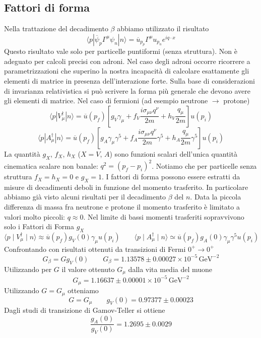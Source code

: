 \subsection{Fattori di forma}
Nella trattazione del decadimento $\beta$ abbiamo utilizzato il risultato 
$$
\langle p | \overline{\psi}_p \Gamma^\mu \psi_n | n \rangle = \overline{u}_{p_p} \Gamma^\mu u_{p_n} e^{iq \cdot x}
$$
Questo risultato vale solo per particelle puntiformi (senza struttura). Non è adeguato per calcoli precisi con adroni. Nel caso degli adroni occorre ricorrere a parametrizzazioni che superino la nostra incapacità di calcolare esattamente gli elementi di matrice in presenza dell'interazione forte. Sulla base di considerazioni di invarianza relativistica si può scrivere la forma più generale che devono avere gli elementi di matrice. Nel caso di fermioni (ad esempio neutrone $\to$ protone)
$$
\langle p | V_\mu^\dagger | n \rangle = \overline{u}(p_f) \left[ g_V \gamma_\mu + f_V \frac{i \sigma_{\mu\nu} q^\nu}{2m} + h_V \frac{q_\mu}{2m} \right] u(p_i)
$$
$$
\langle p | A_\mu^\dagger | n \rangle = \overline{u}(p_f) \left[ g_A \gamma_\mu \gamma^5 + f_A \frac{i \sigma_{\mu\nu} q^\nu}{2m} \gamma^5 + h_A \frac{q_\mu}{2m} \gamma^5 \right] u(p_i)
$$
La quantità $g_X$, $f_X$, $h_X$ ($X=V$, $A$) sono funzioni scalari dell'unica quantità cinematica scalare non banale: $q^2=(p_f-p_i)^2$. Notiamo che per particelle senza struttura $f_X=h_X=0$ e $g_X=1$.
I fattori di forma possono essere estratti da misure di decadimenti deboli in funzione del momento trasferito. In particolare abbiamo già visto alcuni risultati per il decadimento $\beta$ del $n$. Data la piccola differenza di massa fra neutrone e protone il momento trasferito è limitato a valori molto piccoli: $q\approx0$. Nel limite di bassi momenti trasferiti sopravvivono solo i Fattori di Forma $g_X$
$$
\langle p \mid V_\mu^\dagger \mid n \rangle \approx \overline{u}(p_f)g_V(0)\gamma_\mu u(p_i) \quad \quad \langle p \mid A_\mu^\dagger \mid n \rangle \simeq \overline{u}(p_f)g_A(0)\gamma_\mu \gamma^5 u(p_i)
$$
Confrontando con risultati ottenuti da transizioni di Fermi $0^+\to0^+$
$$
G_\beta = G g_V(0) \quad \quad G_\beta = 1.13578 \pm 0.00027 \times 10^{-5} \, \text{GeV}^{-2}
$$
Utilizzando per $G$ il valore ottenuto $G_\mu$ dalla vita media del muone
$$
G_\mu = 1.16637 \pm 0.00001 \times 10^{-5} \, \text{GeV}^{-2}
$$
Utilizzando $G=G_\mu$ otteniamo
$$
G = G_\mu \quad \quad g_V(0) = 0.97377 \pm 0.00023
$$
Dagli studi di transizione di Gamov-Teller si ottiene
$$
\frac{g_A(0)}{g_V(0)} = 1.2695 \pm 0.0029
$$
